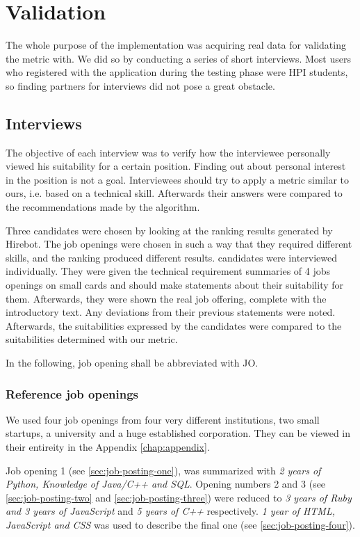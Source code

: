 \chapter{Validation}\label{ch:validation}
The whole purpose of the implementation was acquiring real data for validating
the metric with. We did so by conducting a series of short interviews.
Most users who registered with the application during the testing phase were HPI
students, so finding partners for interviews did not pose a great obstacle.

\section{Interviews}\label{sec:interviews}
The objective of each interview was to verify how the interviewee personally
viewed his suitability for a certain position. Finding out about personal
interest in the position is not a goal. Interviewees should try to apply a
metric similar to ours, i.e. based on a technical skill.
Afterwards their answers were compared to the recommendations made by the algorithm.

Three candidates were chosen by looking at the ranking results generated by Hirebot.
The job openings were chosen in such a way that they required different skills,
and the ranking produced different results. candidates were interviewed individually.
They were given the technical requirement summaries of 4 jobs openings on
small cards and should make statements about their suitability for them.
Afterwards, they were shown the real job offering,
complete with the introductory text. Any deviations from their previous
statements were noted. Afterwards, the suitabilities expressed by the candidates
were compared to the suitabilities determined with our metric.

In the following, job opening shall be abbreviated with JO.

\subsection{Reference job openings}
We used four job openings from four very different institutions,
two small startups, a university and a huge established corporation.
They can be viewed in their entireity in the Appendix \ref{chap:appendix}.

Job opening 1 (see \ref{sec:job-posting-one}), was summarized with
\textit{2 years of Python, Knowledge of Java/C++ and SQL}.
Opening numbers 2 and 3 (see \ref{sec:job-posting-two} and \ref{sec:job-posting-three}) were reduced to \textit{3 years of Ruby and 3 years of JavaScript} and \textit{5 years of C++} respectively. \textit{1 year of HTML, JavaScript and CSS} was used to describe the final one (see \ref{sec:job-posting-four}).

